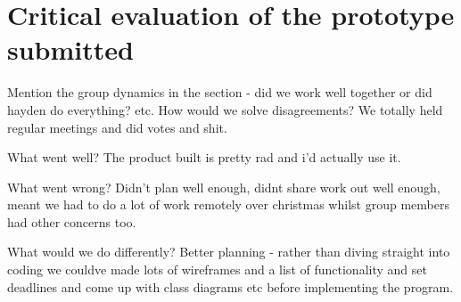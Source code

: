 \documentclass[12pt, a4paper]{article}
\begin{document}
\newpage	
\section{Critical evaluation of the prototype submitted}
Mention the group dynamics in the section - did we work well together or did hayden do everything? etc. How would we solve disagreements? We totally held regular meetings and did votes and shit. 

What went well?
The product built is pretty rad and i'd actually use it.

What went wrong?
Didn't plan well enough, didnt share work out well enough, meant we had to do a lot of work remotely over christmas whilst group members had other concerns too.

What would we do differently?
Better planning - rather than diving straight into coding we couldve made lots of wireframes and a list of functionality and set deadlines and come up with class diagrams etc before implementing the program.
\end{document}
